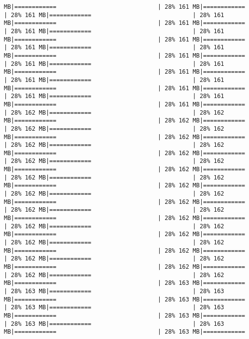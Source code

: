 \documentclass[
]{article}
\begin{document}
\begin{verbatim}
MB|============                             | 28% 161 MB|============                             | 28% 161 MB|============                             | 28% 161 MB|============                             | 28% 161 MB|============                             | 28% 161 MB|============                             | 28% 161 MB|============                             | 28% 161 MB|============                             | 28% 161 MB|============                             | 28% 161 MB|============                             | 28% 161 MB|============                             | 28% 161 MB|============                             | 28% 161 MB|============                             | 28% 161 MB|============                             | 28% 161 MB|============                             | 28% 161 MB|============                             | 28% 161 MB|============                             | 28% 161 MB|============                             | 28% 161 MB|============                             | 28% 161 MB|============                             | 28% 162 MB|============                             | 28% 162 MB|============                             | 28% 162 MB|============                             | 28% 162 MB|============                             | 28% 162 MB|============                             | 28% 162 MB|============                             | 28% 162 MB|============                             | 28% 162 MB|============                             | 28% 162 MB|============                             | 28% 162 MB|============                             | 28% 162 MB|============                             | 28% 162 MB|============                             | 28% 162 MB|============                             | 28% 162 MB|============                             | 28% 162 MB|============                             | 28% 162 MB|============                             | 28% 162 MB|============                             | 28% 162 MB|============                             | 28% 162 MB|============                             | 28% 162 MB|============                             | 28% 162 MB|============                             | 28% 162 MB|============                             | 28% 162 MB|============                             | 28% 162 MB|============                             | 28% 162 MB|============                             | 28% 162 MB|============                             | 28% 162 MB|============                             | 28% 162 MB|============                             | 28% 162 MB|============                             | 28% 162 MB|============                             | 28% 162 MB|============                             | 28% 162 MB|============                             | 28% 163 MB|============                             | 28% 163 MB|============                             | 28% 163 MB|============                             | 28% 163 MB|============                             | 28% 163 MB|============                             | 28% 163 MB|============                             | 28% 163 MB|============                             | 28% 163 MB|============                             | 28% 163 MB|============                             | 28% 163 MB|============          
\end{verbatim}
\end{document}
